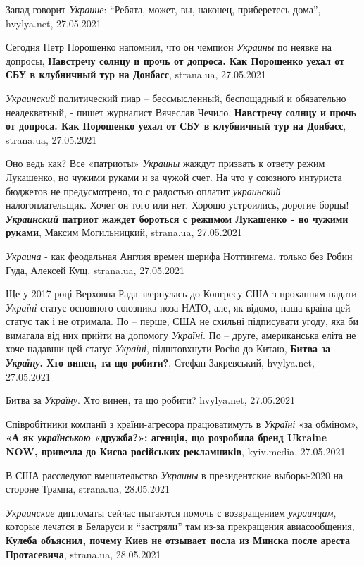 Запад говорит \emph{Украине}: \enquote{Ребята, может, вы, наконец, приберетесь
дома}, hvylya.net, 27.05.2021

Сегодня Петр Порошенко напомнил, что он чемпион \emph{Украины} по неявке на
допросы, \textbf{Навстречу солнцу и прочь от допроса. Как Порошенко уехал от
СБУ в клубничный тур на Донбасс}, strana.ua, 27.05.2021

\emph{Украинский} политический пиар – бессмысленный, беспощадный и обязательно
неадекватный, - пишет журналист Вячеслав Чечило, \textbf{Навстречу солнцу и
прочь от допроса. Как Порошенко уехал от СБУ в клубничный тур на Донбасс},
strana.ua, 27.05.2021

Оно ведь как? Все «патриоты» \emph{Украины} жаждут призвать к ответу режим
Лукашенко, но чужими руками и за чужой счет. На что у союзного интуриста
бюджетов не предусмотрено, то с радостью оплатит \emph{украинский}
налогоплательщик. Хочет он того или нет.  Хорошо устроились, дорогие борцы!
\textbf{\emph{Украинский} патриот жаждет бороться с режимом Лукашенко - но чужими
руками}, Максим Могильницкий, strana.ua, 27.05.2021

\emph{Украина} - как феодальная Англия времен шерифа Ноттингема, только без Робин
Гуда, Алексей Кущ, strana.ua, 27.05.2021

Ще у 2017 році Верховна Рада звернулась до Конгресу США з проханням надати
\emph{Україні} статус основного союзника поза НАТО, але, як відомо, наша країна
цей статус так і не отримала. По – перше, США не схильні підписувати угоду, яка
би вимагала від них прийти на допомогу \emph{Україні}. По – друге, американська
еліта не хоче надавши цей статус \emph{Україні}, підштовхнути Росію до Китаю,
\textbf{Битва за \emph{Україну}. Хто винен, та що робити?}, Стефан Закревський,
hvylya.net, 27.05.2021

Битва за \emph{Україну}. Хто винен, та що робити? hvylya.net, 27.05.2021

Співробітники компанії з країни-агресора працюватимуть в \emph{Україні} «за
обміном», \textbf{«А як \emph{українською} «дружба?»: агенція, що розробила бренд
Ukraine NOW, привезла до Києва російських рекламників}, kyiv.media, 27.05.2021

В США расследуют вмешательство \emph{Украины} в президентские выборы-2020 на
стороне Трампа, strana.ua, 28.05.2021

\emph{Украинские} дипломаты сейчас пытаются помочь с возвращением \emph{украинцам}, которые
лечатся в Беларуси и \enquote{застряли} там из-за прекращения авиасообщения,
\textbf{Кулеба объяснил, почему Киев не отзывает посла из Минска после ареста
Протасевича}, strana.ua, 28.05.2021

